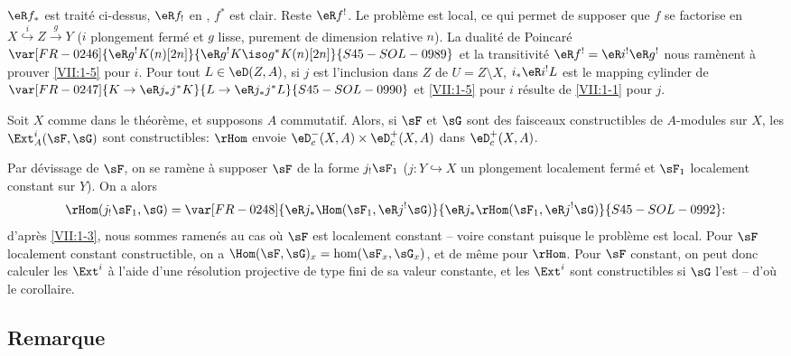 $\eR f_\ast$ est traité ci-dessus, $\eR f_!$ en , 
$f^\ast$ est clair. Reste $\eR f^!$. Le problème est local, ce qui permet de 
supposer que $f$ se factorise en $X\overset{i}{\hookrightarrow} Z \xrightarrow g Y$ ($i$ 
plongement fermé et $g$ lisse, purement de dimension relative $n$). La 
dualité de Poincaré $\var[FR-0246]{\eR g^! K(n)[2 n]}{\eR g^! K \iso g^\ast K(n)[2 n]}{S45-SOL-0989}$ et la transitivité 
$\eR f^! = \eR i^! \eR g^!$ nous ramènent à prouver \ref{VII:1-5} pour $i$. 
Pour tout $L\in \eD(Z,A)$, si $j$ est l'inclusion dans $Z$ de $U=Z\setminus X$, 
$i_\ast \eR i^! L$ est le mapping cylinder de $\var[FR-0247]{K\to \eR j_\ast j^\ast K}{L\to \eR j_\ast j^\ast L}{S45-SOL-0990}$ et 
\ref{VII:1-5} pour $i$ résulte de \ref{VII:1-1} pour $j$. 





\begin{corollary_}\label{VII:1-6}
Soit $X$ comme dans le théorème, et supposons $A$ commutatif. Alors, si 
$\sF$ et $\sG$ sont des faisceaux constructibles de $A$-modules sur $X$, les 
$\Ext_A^i(\sF,\sG)$ sont constructibles: $\rHom$ envoie 
$\eD_c^-(X,A)\times \eD_c^+(X,A)$ dans $\eD_c^+(X,A)$. 
\end{corollary_}

Par dévissage de $\sF$, on se ramène à supposer $\sF$ de la forme 
$j_!\sF_1$ ($j:Y\hookrightarrow X$ un plongement localement fermé et $\sF_1$ 
localement constant sur $Y$). On a alors 
\[
  \rHom(j_! \sF_1,\sG) = \var[FR-0248]{\eR j_\ast \Hom(\sF_1,\eR j^! \sG)}{\eR j_\ast \rHom(\sF_1,\eR j^! \sG)}{S45-SOL-0992} \text{:} 
\]
d'après \ref{VII:1-3}, nous sommes ramenés au cas où $\sF$ est localement 
constant -- voire constant puisque le problème est local. Pour $\sF$ 
localement constant constructible, on a $\Hom(\sF,\sG)_x=\hom(\sF_x,\sG_x)$, 
et de même pour $\rHom$. Pour $\sF$ constant, on peut donc calculer les 
$\Ext^i$ à l'aide d'une résolution projective de type fini de sa valeur 
constante, et les $\Ext^i$ sont constructibles si $\sG$ l'est -- d'où le 
corollaire. 





\subsection{Remarque}\label{VII:1-7}

